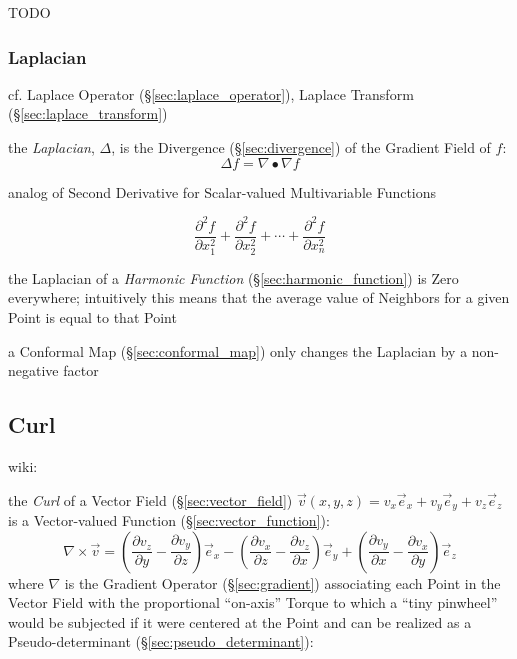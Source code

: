 TODO



\subsubsection{Laplacian}\label{sec:laplacian}

\fist cf. Laplace Operator (\S\ref{sec:laplace_operator}), Laplace Transform
(\S\ref{sec:laplace_transform}) %

the \emph{Laplacian}, $\Delta$, is the Divergence (\S\ref{sec:divergence}) of
the Gradient Field of $f$:
\[
  \Delta f = \nabla \bullet \nabla f
\]

analog of Second Derivative for Scalar-valued Multivariable Functions

\[
  \frac{\partial^2 f}{\partial{x_1^2}} +
  \frac{\partial^2 f}{\partial{x_2^2}} +
  \cdots +
  \frac{\partial^2 f}{\partial{x_n^2}}
\]

the Laplacian of a \emph{Harmonic Function} (\S\ref{sec:harmonic_function}) is
Zero everywhere; intuitively this means that the average value of Neighbors for
a given Point is equal to that Point

a Conformal Map (\S\ref{sec:conformal_map}) only changes the Laplacian by a
non-negative factor



\subsection{Curl}\label{sec:curl}

wiki:

the \emph{Curl} of a Vector Field (\S\ref{sec:vector_field}) $\vec{v}(x,y,z) =
v_x\vec{e}_x + v_y\vec{e}_y + v_z\vec{e}_z$ is a Vector-valued Function
(\S\ref{sec:vector_function}):
\[
  \nabla\times\vec{v} =
    (\frac{\partial v_z}{\partial y}-\frac{\partial v_y}{\partial z})\vec{e}_x -
    (\frac{\partial v_x}{\partial z}-\frac{\partial v_z}{\partial x})\vec{e}_y +
    (\frac{\partial v_y}{\partial x}-\frac{\partial v_x}{\partial y})\vec{e}_z
\]
where $\nabla$ is the Gradient Operator (\S\ref{sec:gradient}) associating each
Point in the Vector Field with the proportional ``on-axis'' Torque to which a
``tiny pinwheel'' would be subjected if it were centered at the Point and can
be realized as a Pseudo-determinant (\S\ref{sec:pseudo_determinant}):

